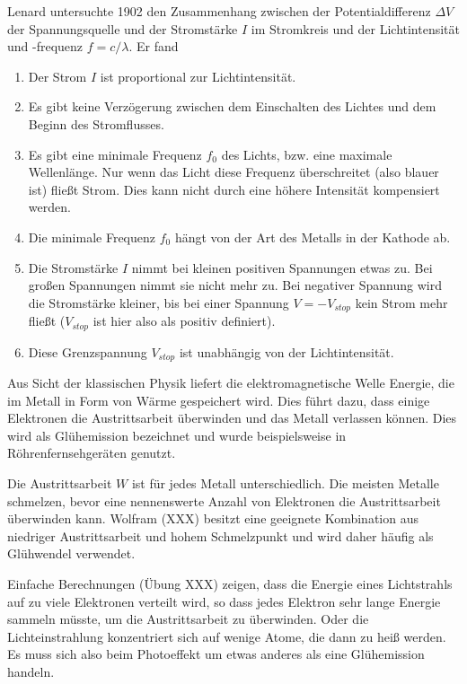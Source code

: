Lenard untersuchte 1902 den Zusammenhang zwischen der Potentialdifferenz $\Delta V$ der Spannungsquelle und der Stromstärke $I$ im Stromkreis und der Lichtintensität und -frequenz $f = c / \lambda$. Er fand
\begin{enumerate}
    \item Der Strom $I$ ist proportional zur Lichtintensität.
    \item Es gibt keine Verzögerung zwischen dem Einschalten des Lichtes und dem Beginn des Stromflusses.
    \item Es gibt eine minimale Frequenz $f_0$ des Lichts, bzw. eine maximale Wellenlänge. Nur wenn das Licht diese Frequenz überschreitet (also blauer ist) fließt Strom. Dies kann nicht durch eine höhere Intensität kompensiert werden.
    \item Die minimale Frequenz $f_0$ hängt von der Art des Metalls in der Kathode ab.
    \item Die Stromstärke $I$ nimmt bei kleinen positiven Spannungen etwas zu. Bei großen Spannungen nimmt sie nicht mehr zu. Bei negativer Spannung wird die Stromstärke kleiner, bis bei einer Spannung $V = -V_{stop}$ kein Strom mehr fließt ($V_{stop}$ ist hier also als positiv definiert). 
    \item Diese Grenzspannung $V_{stop}$ ist unabhängig von der Lichtintensität. 
\end{enumerate}

Aus Sicht der klassischen Physik liefert die elektromagnetische Welle Energie, die im Metall in Form von Wärme gespeichert wird. Dies führt dazu, dass einige Elektronen die Austrittsarbeit überwinden und das Metall verlassen können. Dies wird als Glühemission bezeichnet und wurde beispielsweise in Röhrenfernsehgeräten genutzt.

Die Austrittsarbeit $W$ ist für jedes Metall unterschiedlich. Die meisten Metalle schmelzen, bevor eine nennenswerte Anzahl von Elektronen die Austrittsarbeit überwinden kann. Wolfram (XXX) besitzt eine geeignete Kombination aus niedriger Austrittsarbeit und hohem Schmelzpunkt und wird daher häufig als Glühwendel verwendet.

Einfache Berechnungen (Übung XXX) zeigen, dass die Energie eines Lichtstrahls auf zu viele Elektronen verteilt wird, so dass jedes Elektron sehr lange Energie sammeln müsste, um die Austrittsarbeit zu überwinden. Oder die Lichteinstrahlung konzentriert sich auf wenige Atome, die dann zu heiß werden. Es muss sich also beim Photoeffekt um etwas anderes als eine Glühemission handeln.

